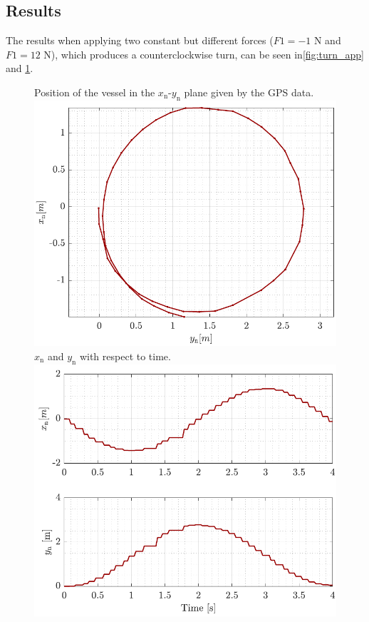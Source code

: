 \subsection*{Results}
The results when applying two constant but different forces ($F1=-1$ N and $F1=12$ N), which produces a counterclockwise turn, can be seen in\autoref{fig:turn_app} and \ref{fig:turn_time_app}.
\begin{figure}[H]
    \captionbox 
    {   
        Position of the vessel in the $x_\mathrm{n}$-$y_\mathrm{n}$ plane given by the GPS data.
        \label{fig:turn_app}
    }                                                                 
    {                                                                  
        \includegraphics[width=.45\textwidth]{figures/turn_app}         
    }                                                                    
    \hspace{5pt}                                                          
    \captionbox  
    {      
        $x_\mathrm{n}$ and $y_\mathrm{n}$ with respect to time.
        \label{fig:turn_time_app}
    }                                                                          
    {
        \includegraphics[width=.45\textwidth]{figures/turn_time_app}
    }
\end{figure}
